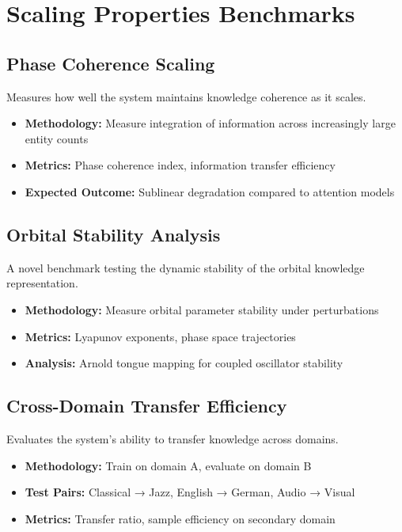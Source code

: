 \section{Scaling Properties Benchmarks}

\subsection{Phase Coherence Scaling}

Measures how well the system maintains knowledge coherence as it scales.

\begin{itemize}
    \item \textbf{Methodology:} Measure integration of information across increasingly large entity counts
    \item \textbf{Metrics:} Phase coherence index, information transfer efficiency
    \item \textbf{Expected Outcome:} Sublinear degradation compared to attention models
\end{itemize}

\subsection{Orbital Stability Analysis}

A novel benchmark testing the dynamic stability of the orbital knowledge representation.

\begin{itemize}
    \item \textbf{Methodology:} Measure orbital parameter stability under perturbations
    \item \textbf{Metrics:} Lyapunov exponents, phase space trajectories
    \item \textbf{Analysis:} Arnold tongue mapping for coupled oscillator stability
\end{itemize}

\subsection{Cross-Domain Transfer Efficiency}

Evaluates the system's ability to transfer knowledge across domains.

\begin{itemize}
    \item \textbf{Methodology:} Train on domain A, evaluate on domain B
    \item \textbf{Test Pairs:} Classical → Jazz, English → German, Audio → Visual
    \item \textbf{Metrics:} Transfer ratio, sample efficiency on secondary domain
\end{itemize}

